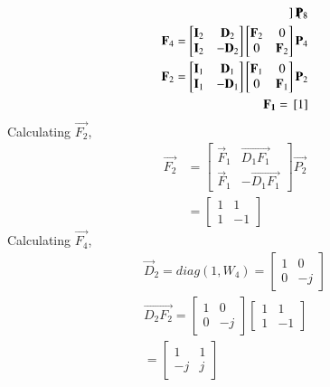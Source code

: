 \documentclass[journal,12pt,twocolumn]{IEEEtran}
\renewcommand\thesection{\arabic{section}}
\begin{document}
\begin{enumerate}[label=\arabic*.,ref=\thesection.\theenumi]
\begin{align}
\begin{bmatrix}
		\end{bmatrix}
		\mathbf{P}_{8}\\
		\mathbf{F}_{4}=
		\begin{bmatrix}
			\mathbf{I}_{2} & \mathbf{D}_{2} \\
			\mathbf{I}_{2} & -\mathbf{D}_{2}
		\end{bmatrix}
		\begin{bmatrix}
			\mathbf{F}_{2} & 0 \\
			0 & \mathbf{F}_{2}
		\end{bmatrix}
		\mathbf{P}_{4}\\
		\mathbf{F}_{2}=
		\begin{bmatrix}
			\mathbf{I}_{1} & \mathbf{D}_{1} \\
			\mathbf{I}_{1} & -\mathbf{D}_{1}
		\end{bmatrix}
		\begin{bmatrix}
			\mathbf{F}_{1} & 0 \\
			0 & \mathbf{F}_{1}
		\end{bmatrix}
		\mathbf{P}_{2}\\
		\mathbf{F_1}={}\left[1\right]
	\end{align}
	Calculating $\vec{F_2}$,
	\begin{align}
		\vec{F_2}&=\begin{bmatrix}
			\vec{F}_{1} & \vec{D_1F_1} \\
			\vec{F}_{1} & -\vec{D_1F_1}
		\end{bmatrix}\vec{P_2}\\
		&=\begin{bmatrix}1&1\\1&-1\end{bmatrix}
	\end{align}
	Calculating $\vec{F_4}$,
	\begin{align}
		\vec{D}_{2}=diag(1,W_4)
		=\begin{bmatrix}
			1&0\\0&-j
		\end{bmatrix}\\
		\vec{D_2F_2}=\begin{bmatrix}
			1&0\\0&-j
		\end{bmatrix}\begin{bmatrix}
			1&1\\1&-1
		\end{bmatrix}\\
		=\begin{bmatrix}
			1&1\\-j&j
		\end{bmatrix}\\

\end{align}
\end{enumerate}
\end{document}
